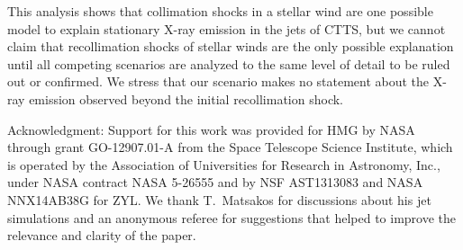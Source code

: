 \documentclass{emulateapj}
\begin{document}
This analysis shows that collimation shocks in a stellar wind are one possible model to explain stationary X-ray emission in the jets of CTTS, but we cannot claim that recollimation shocks of stellar winds are the only possible explanation until all competing scenarios are analyzed to the same level of detail to be ruled out or confirmed. We stress that our scenario makes no statement about the X-ray emission observed beyond the initial recollimation shock.




Acknowledgment: 
Support for this work was provided for HMG by NASA through grant GO-12907.01-A from the Space Telescope Science Institute, which is operated by the Association of Universities for Research in Astronomy, Inc., under NASA contract NASA 5-26555 and by NSF AST1313083 and NASA NNX14AB38G for ZYL. We thank T.~Matsakos for discussions about his jet simulations and an anonymous referee for suggestions that helped to improve the relevance and clarity of the paper.


\end{document}
